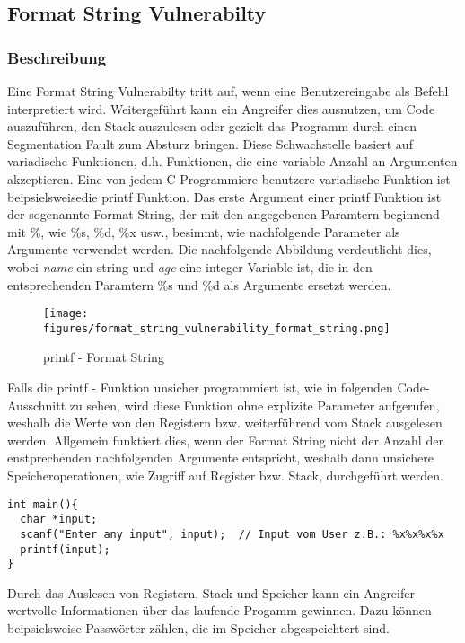 \documentclass[a4paper,
DIV=13,
12pt,
BCOR=10mm,
department=FakIM,
oneside,
parskip=half,
automark,
listof=totocnumbered,
bibliography=totocnumbered,
acronym=totocnumbered
] {OTHRartcl}
\begin{document}
\subsection{Format String Vulnerabilty}
\subsubsection{Beschreibung}
Eine Format String Vulnerabilty tritt auf, wenn eine Benutzereingabe als Befehl interpretiert wird.
Weitergeführt kann ein Angreifer dies ausnutzen, um Code auszuführen, den Stack auszulesen oder gezielt das Programm durch einen Segmentation Fault zum Absturz bringen.
Diese Schwachstelle basiert auf variadische Funktionen, d.h. Funktionen, die eine variable Anzahl an Argumenten akzeptieren.
Eine von jedem C Programmiere benutzere variadische Funktion ist beipsielsweisedie printf Funktion.
Das erste Argument einer printf Funktion ist der sogenannte Format String, der mit den angegebenen Paramtern beginnend mit \%, wie \%s, \%d, \%x usw., besimmt, wie nachfolgende Parameter
als Argumente verwendet werden.
Die nachfolgende Abbildung verdeutlicht dies, wobei \textit{name} ein string und \textit{age} eine integer Variable ist, die in den entsprechenden
Paramtern \%s und \%d als Argumente ersetzt werden.
\begin{figure}[ht!]
  \begin{center}
    \texttt{[image: figures/format\_string\_vulnerability\_format\_string.png]}
    \caption{printf - Format String}
    \label{Abbildung 1: printf - Format String}
  \end{center}
\end{figure}

Falls die printf - Funktion unsicher programmiert ist, wie in folgenden Code-Ausschnitt zu sehen,
wird diese Funktion ohne explizite Parameter aufgerufen, weshalb die Werte von den Registern bzw. weiterführend vom Stack ausgelesen werden.
Allgemein funktiert dies, wenn der Format String nicht der Anzahl der enstprechenden nachfolgenden Argumente entspricht, weshalb dann unsichere Speicheroperationen, wie Zugriff auf Register bzw. Stack,
durchgeführt werden.
\begin{verbatim}
int main(){
  char *input;
  scanf("Enter any input", input);  // Input vom User z.B.: %x%x%x%x
  printf(input);
}
\end{verbatim}
Durch das Auslesen von Registern, Stack und Speicher kann ein Angreifer wertvolle Informationen über das laufende Progamm gewinnen.
Dazu können beipsielsweise Passwörter zählen, die im Speicher abgespeichtert sind.
\end{document}
